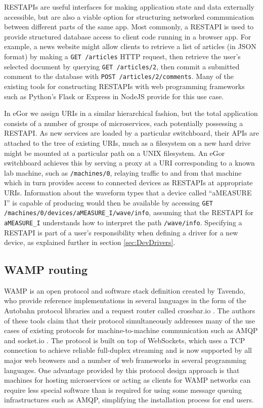 \documentclass[../thesis]{subfiles}
\begin{document}
\glspl{RESTAPI} are useful interfaces for making application state and
data externally accessible, but are also a viable option for
structuring networked communication between different parts of the
same app. Most commonly, a \gls{RESTAPI} is used to provide structured
database access to client code running in a browser app. For example,
a news website might allow clients to retrieve a list of articles (in
\gls{JSON} format) by making a \texttt{GET /articles} HTTP request,
then retrieve the user's selected document by querying \texttt{GET
  /articles/2}, then commit a submitted comment to the database with
\texttt{POST /articles/2/comments}. Many of the existing tools for
constructing \glspl{RESTAPI} with web programming frameworks such as
Python's Flask \cite{Flask} or Express in NodeJS \cite{Express}
provide for this use case.

In eGor we assign URIs in a similar hierarchical fashion, but the
total application consists of a number of groups of microservices,
each potentially possessing a \gls{RESTAPI}. As new services are
loaded by a particular switchboard, their \glspl{API} are attached to
the tree of existing \glspl{URI}, much as a filesystem on a new hard
drive might be mounted at a particular path on a UNIX filesystem.  An
eGor switchboard achieves this by serving a proxy at a \gls{URI}
corresponding to a known lab machine, such as \texttt{/machines/0},
relaying traffic to and from that machine which in turn provides
access to connected devices as \glspl{RESTAPI} at appropriate
\glspl{URI}. Information about the waveform types that a device called
``aMEASURE I'' is capable of producing would then be available by
accessing \texttt{GET /machines/0/devices/aMEASURE\_I/wave/info},
assuming that the \gls{RESTAPI} for \texttt{aMEASURE\_I} understands
how to interpret the path \texttt{/wave/info}. Specifying a
\gls{RESTAPI} is part of a user's responsibility when defining a
driver for a new device, as explained further in section
\ref{sec:DevDrivers}.

\subsection{WAMP routing}
\gls{WAMP} is an open protocol and software stack definition created
by Tavendo, who provide reference implementations in several languages
in the form of the Autobahn protocol libraries and a request router
called crossbar.io \cite{CrossbarIO}. The authors of these tools claim
that their protocol simultaneously addresses many of the use cases of
existing protocols for machine-to-machine communication such as
\gls{AMQP} and socket.io \cite{socket.io}. The protocol is built on
top of WebSockets, which uses a TCP connection to achieve reliable
full-duplex streaming and is now supported by all major web browsers
and a number of web frameworks in several programming languages. One
advantage provided by this protocol design approach is that machines
for hosting microservices or acting as clients for \gls{WAMP} networks
can require less special software than is required for using some
message queuing infrastructures such as \gls{AMQP}, simplifying the
installation process for end users.
\end{document}
